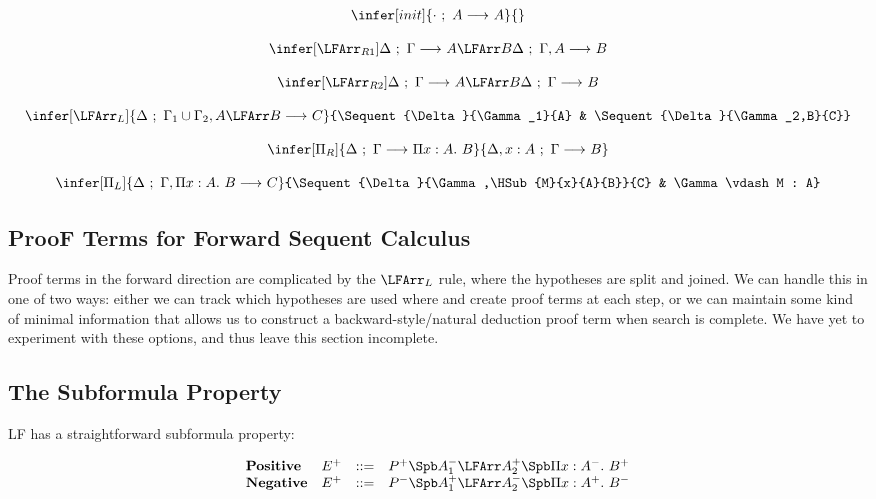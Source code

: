 $$
\begin{array}{c}
\infer[init]{\Sequent{\cdot}{A}{A}}{} \\\\
\infer[\LFArr_{R1}]{\Sequent{\Delta}{\Gamma}{A\LFArr B}}
                  {\Sequent{\Delta}{\Gamma,A}{B}} \\\\
\infer[\LFArr_{R2}]{\Sequent{\Delta}{\Gamma}{A\LFArr B}}
                  {\Sequent{\Delta}{\Gamma}{B}} \\\\
\infer[\LFArr_L]{\Sequent{\Delta}{\Gamma_1\cup\Gamma_2,A\LFArr B}{C}}
                {\Sequent{\Delta}{\Gamma_1}{A} & 
                 \Sequent{\Delta}{\Gamma_2,B}{C}}\\\\
\infer[\Pi_R]{\Sequent{\Delta}{\Gamma}{\PiTyp{x}{A}{B}}}
             {\Sequent{\Delta,x:A}{\Gamma}{B}} \\\\
\infer[\Pi_L]{\Sequent{\Delta}{\Gamma,\PiTyp{x}{A}{B}}{C}}
             {\Sequent{\Delta}{\Gamma,\HSub{M}{x}{A}{B}}{C} & 
              \Gamma \vdash M : A}
\end{array} 
$$

\subsection{ProoF Terms for Forward Sequent Calculus}

Proof terms in the forward direction are complicated by the
$\LFArr_L$ rule, where the hypotheses are split and joined.
We can handle this in one of two ways: either we can
track which hypotheses are used where and create proof terms
at each step, or we can maintain some kind of minimal information
that allows us to construct a backward-style/natural deduction
proof term when search is complete.  We have yet to experiment
with these options, and thus leave this section incomplete.

\subsection{The Subformula Property}

LF has a straightforward subformula property:

$$
\begin{array}{llll}
\mathbf{Positive} & E^+ & ::= & P^+ \Spb A_1^- \LFArr A_2^+ \Spb \PiTyp{x}{A^-}{B^+}\\
\mathbf{Negative} & E^+ & ::= & P^- \Spb A_1^+ \LFArr A_2^- \Spb \PiTyp{x}{A^+}{B^-}\\
\end{array} 
$$

